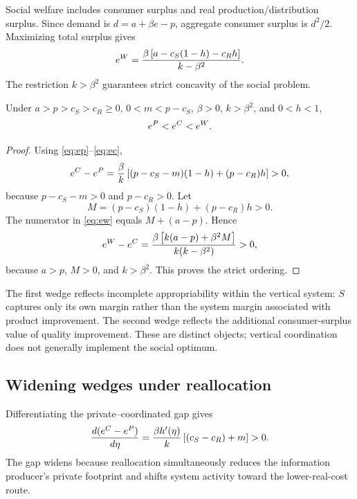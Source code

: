 Social welfare includes consumer surplus and real production/distribution surplus. Since demand is $d=a+\beta e-p$, aggregate consumer surplus is $d^2/2$. Maximizing total surplus gives
\begin{equation}
    e^{W}
    =\frac{\beta\left[a-c_S(1-h)-c_Rh\right]}{k-\beta^2}.
    \label{eq:ew}
\end{equation}
The restriction $k>\beta^2$ guarantees strict concavity of the social problem.

\begin{theorem}\label{thm:welfareordering}
Under $a>p>c_S>c_R\geq0$, $0<m<p-c_S$, $\beta>0$, $k>\beta^2$, and $0<h<1$,
\begin{equation}
    e^{P}<e^{C}<e^{W}.
    \label{eq:ordering}
\end{equation}
\end{theorem}

\begin{proof}
Using \eqref{eq:ep}--\eqref{eq:ec},
\[
e^{C}-e^{P}
=\frac{\beta}{k}\left[(p-c_S-m)(1-h)+(p-c_R)h\right]>0,
\]
because $p-c_S-m>0$ and $p-c_R>0$. Let
\[
M=(p-c_S)(1-h)+(p-c_R)h>0.
\]
The numerator in \eqref{eq:ew} equals $M+(a-p)$. Hence
\[
e^{W}-e^{C}
=\frac{\beta\left[k(a-p)+\beta^2M\right]}{k(k-\beta^2)}>0,
\]
because $a>p$, $M>0$, and $k>\beta^2$. This proves the strict ordering.
\end{proof}

The first wedge reflects incomplete appropriability within the vertical system: $S$ captures only its own margin rather than the system margin associated with product improvement. The second wedge reflects the additional consumer-surplus value of quality improvement. These are distinct objects; vertical coordination does not generally implement the social optimum.

\subsection{Widening wedges under reallocation}

Differentiating the private--coordinated gap gives
\begin{equation}
    \frac{d(e^{C}-e^{P})}{d\eta}
    =\frac{\beta h'(\eta)}{k}\left[(c_S-c_R)+m\right]>0.
    \label{eq:wedgepc}
\end{equation}
The gap widens because reallocation simultaneously reduces the information producer's private footprint and shifts system activity toward the lower-real-cost route.

